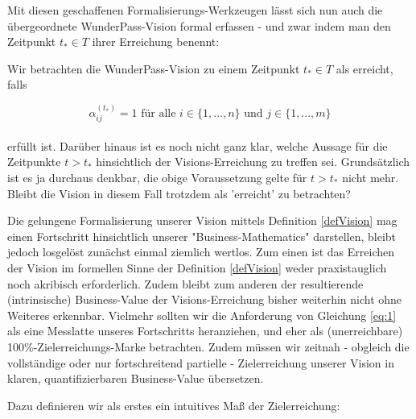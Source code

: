 
\vspace{0.3cm}

Mit diesen geschaffenen Formalisierungs-Werkzeugen lässt sich nun auch die übergeordnete WunderPass-Vision formal erfassen - und zwar indem man den Zeitpunkt $t_{*} \in T$ ihrer Erreichung benennt:

\begin{Def}\label{defVision}

Wir betrachten die WunderPass-Vision zu einem Zeitpunkt $t_{*} \in T$ als erreicht, falls

\vspace{0.3cm}

\begin{equation}
\label{eq:1}
  \alpha^{(t_{*})}_{ij} = 1 \textrm{ für alle } i \in \{1,...,n\} \textrm{ und } j \in \{1,...,m\}
\end{equation}\\
erfüllt ist. Darüber hinaus ist es noch nicht ganz klar, welche Aussage für die Zeitpunkte $t > t_{*}$ hinsichtlich der Visions-Erreichung zu treffen sei. Grundsätzlich ist es ja durchaus denkbar, die obige Voraussetzung gelte für $t > t_{*}$ nicht mehr. Bleibt die Vision in diesem Fall trotzdem als 'erreicht' zu betrachten?

\end{Def}

\vspace{1cm}

Die gelungene Formalisierung unserer Vision mittels Definition \ref{defVision} mag einen Fortschritt hinsichtlich unserer "Business-Mathematics" darstellen, bleibt jedoch losgelöst zunächst einmal ziemlich wertlos. Zum einen ist das Erreichen der Vision im formellen Sinne der Definition \ref{defVision} weder praxistauglich noch akribisch erforderlich. Zudem bleibt zum anderen der resultierende (intrinsische) Business-Value der Visions-Erreichung bisher weiterhin nicht ohne Weiteres erkennbar.
Vielmehr sollten wir die Anforderung von Gleichung \eqref{eq:1} als eine Messlatte unseres Fortschritts heranziehen, und eher als (unerreichbare) 100\%-Zielerreichungs-Marke betrachten. Zudem müssen wir zeitnah - obgleich die vollständige oder nur fortschreitend partielle - Zielerreichung unserer Vision in klaren, quantifizierbaren Business-Value übersetzen.

Dazu definieren wir als erstes ein intuitives Maß der Zielerreichung:

